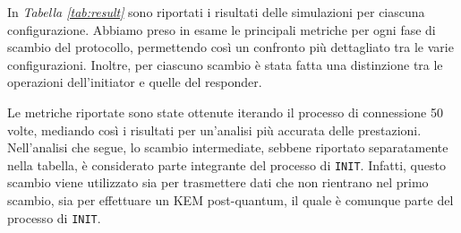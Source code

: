 \noindent
In \textit{Tabella \ref{tab:result}} sono riportati i risultati delle simulazioni per ciascuna
configu\-razione. Abbiamo preso in esame le principali metriche per ogni fase di
scambio del protocollo, permettendo così un confronto più dettagliato tra le
varie configurazioni. Inoltre, per ciascuno scambio è stata fatta una
distinzione tra le operazioni dell'initiator e quelle del responder.

\noindent
Le metriche riportate sono state ottenute iterando il processo di connessione 50
volte, mediando così i risultati per un'analisi più accurata delle prestazioni.\\

\noindent
Nell'analisi che segue, lo scambio intermediate, sebbene riportato separa\-tamente
nella tabella, è considerato parte integrante del processo di \texttt{INIT}. Infatti,
questo scambio viene utilizzato sia per trasmettere dati che non rientrano nel
primo scambio, sia per effettuare un KEM post-quantum, il quale è comunque parte
del processo di \texttt{INIT}.\\

